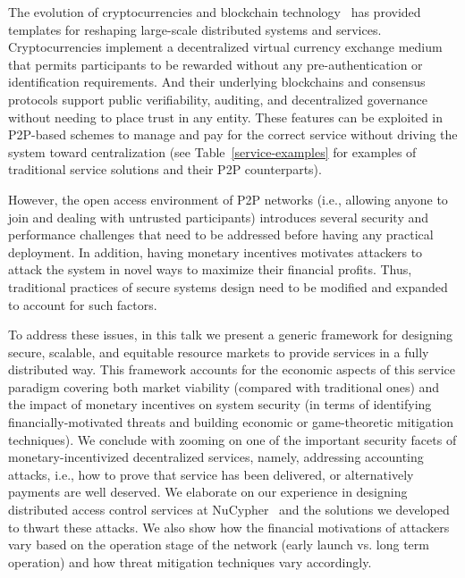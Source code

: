 \documentclass{llncs}
\begin{document}
The evolution of cryptocurrencies and blockchain technology~\cite{bitcoin,ethereum} has provided templates for reshaping large-scale distributed systems and services. Cryptocurrencies implement a decentralized virtual currency exchange medium that permits participants to be rewarded without any pre-authentication or identification requirements. And their underlying blockchains and consensus protocols support public verifiability, auditing, and decentralized governance without needing to place trust in any entity. These features can be exploited in P2P-based schemes to manage and pay for the correct service without driving the system toward centralization (see Table~\ref{service-examples} for examples of traditional service solutions and their P2P counterparts).


However, the open access environment of P2P networks (i.e., allowing anyone to join and dealing with untrusted participants) introduces several security and performance challenges that need to be addressed before having any practical deployment. In addition, having monetary incentives motivates attackers to attack the system in novel ways to maximize their financial profits. Thus, traditional practices of secure systems design need to be modified and expanded to account for such factors.


To address these issues, in this talk we present a generic framework for designing secure, scalable, and equitable resource markets to provide services in a fully distributed way. This framework accounts for the economic aspects of this service paradigm covering both market viability (compared with traditional ones) and the impact of monetary incentives on system security (in terms of identifying financially-motivated threats and building economic or game-theoretic mitigation techniques). We conclude with zooming on one of the important security facets of monetary-incentivized decentralized services, namely, addressing accounting attacks, i.e., how to prove that service has been delivered, or alternatively payments are well deserved. We elaborate on our experience in designing distributed access control services at NuCypher~\cite{nucypher} and the solutions we developed to thwart these attacks. We also show how the financial motivations of attackers vary based on the operation stage of the network (early launch vs. long term operation) and how threat mitigation techniques vary accordingly.
\end{document}

